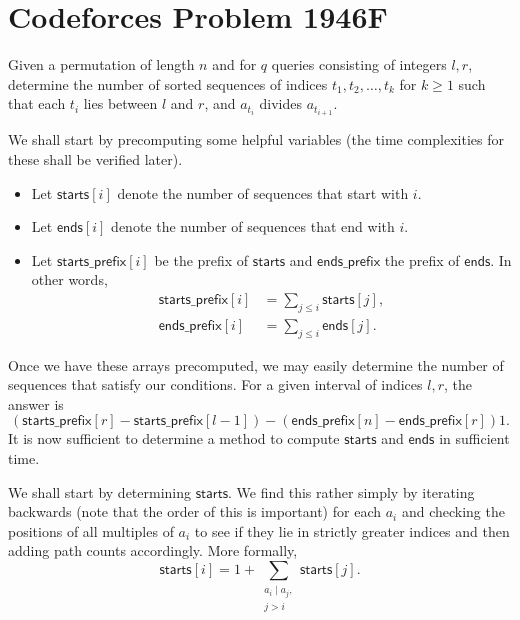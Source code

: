\documentclass[a4paper, 12pt]{article}
\begin{document}
\section*{Codeforces Problem 1946F}

\begin{chirpbox}
    \begin{problem}
        Given a permutation of length \( n \) and for \( q \) queries
        consisting of integers \( l, r \), determine the number of sorted
        sequences of indices \( t_1, t_2, \ldots, t_k \) for \( k \ge 1 \) such
        that each \( t_i \) lies between \( l \) and \( r \), and \( a_{t_i} \)
        divides \( a_{t_{i+1}} \).
    \end{problem}
\end{chirpbox}

\begin{solution}[\textcolor{red}{Incorrect}]
    We shall start by precomputing some helpful variables (the time
    complexities for these shall be verified later).
    \begin{itemize}
        \item Let \( \textsf{starts}[i] \) denote the number of sequences that
            start with \( i \).
        \item Let \( \textsf{ends}[i] \) denote the number of sequences that
            end with \( i \).
        \item Let \( \textsf{starts\_prefix}[i] \) be the prefix of \(
            \textsf{starts} \) and \( \textsf{ends\_prefix} \) the prefix of \(
            \textsf{ends} \). In other words,
        \begin{align*}
            \textsf{starts\_prefix}[i] &= \sum_{j \le i} \textsf{starts}[j], \\
            \textsf{ends\_prefix}[i] &= \sum_{j \le i} \textsf{ends}[j]
        .\end{align*}
    \end{itemize}
    Once we have these arrays precomputed, we may easily determine the number
    of sequences that satisfy our conditions. For a given interval of indices
    \( l, r \), the answer is
    \[
        (\textsf{starts\_prefix}[r] - \textsf{starts\_prefix}[l-1]) - (\textsf{ends\_prefix}[n] - \textsf{ends\_prefix}[r])1
    .\]
    It is now sufficient to determine a method to compute \( \textsf{starts} \)
    and \( \textsf{ends} \) in sufficient time.

    We shall start by determining \( \textsf{starts} \). We find this rather
    simply by iterating backwards (note that the order of this is important)
    for each \( a_i \) and checking the positions of all multiples of \( a_i \)
    to see if they lie in strictly greater indices and then adding path counts
    accordingly. More formally,
    \[
        \textsf{starts}[i] = 1 + \sum_{\substack{a_i \mid a_j, \\ j > i}} \textsf{starts}[j]
    .\]


\end{solution}
\end{document}
